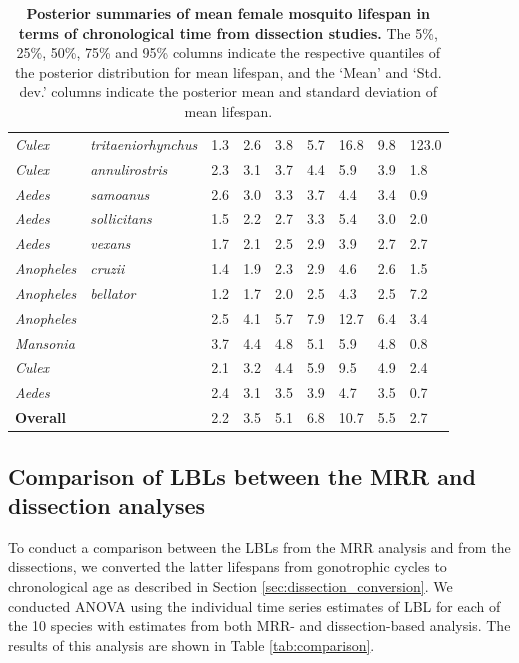 \documentclass[12pt]{article}
\begin{document}
\begin{table}[htbp!]
\begin{tabular}{l|l|l|l|l|l|l|l|l}
		\textit{Culex} & \textit{tritaeniorhynchus} & 1.3 & 2.6 & 3.8 & 5.7 & 16.8 & 9.8 & 123.0 \\
		\textit{Culex} & \textit{annulirostris} & 2.3 & 3.1 & 3.7 & 4.4 & 5.9 & 3.9 & 1.8 \\
		\textit{Aedes} & \textit{samoanus} & 2.6 & 3.0 & 3.3 & 3.7 & 4.4 & 3.4 & 0.9 \\
		\textit{Aedes} & \textit{sollicitans} & 1.5 & 2.2 & 2.7 & 3.3 & 5.4 & 3.0 & 2.0 \\
		\textit{Aedes} & \textit{vexans} & 1.7 & 2.1 & 2.5 & 2.9 & 3.9 & 2.7 & 2.7 \\
		\textit{Anopheles} & \textit{cruzii} & 1.4 & 1.9 & 2.3 & 2.9 & 4.6 & 2.6 & 1.5 \\
		\textit{Anopheles} & \textit{bellator} & 1.2 & 1.7 & 2.0 & 2.5 & 4.3 & 2.5 & 7.2 \\
		\hline
		\textit{Anopheles} & \textit{} & 2.5 & 4.1 & 5.7 & 7.9 & 12.7 & 6.4 & 3.4 \\
		\textit{Mansonia} & \textit{} & 3.7 & 4.4 & 4.8 & 5.1 & 5.9 & 4.8 & 0.8 \\
		\textit{Culex} & \textit{} & 2.1 & 3.2 & 4.4 & 5.9 & 9.5 & 4.9 & 2.4 \\
		\textit{Aedes} & \textit{} & 2.4 & 3.1 & 3.5 & 3.9 & 4.7 & 3.5 & 0.7 \\
		\hline
		\textbf{Overall} & \textit{} & 2.2 & 3.5 & 5.1 & 6.8 & 10.7 & 5.5 & 2.7 \\
	\end{tabular}
	\caption{\textbf{Posterior summaries of mean female mosquito lifespan in terms of chronological time from dissection studies.} The 5\%, 25\%, 50\%, 75\% and 95\% columns indicate the respective quantiles of the posterior distribution for mean lifespan, and the `Mean' and `Std. dev.' columns indicate the posterior mean and standard deviation of mean lifespan.}
	\label{tab:dissection_estimated_lifespans_chron}%
\end{table}

\subsection{Comparison of LBLs between the MRR and dissection analyses}
To conduct a comparison between the LBLs from the MRR analysis and from the dissections, we converted the latter lifespans from gonotrophic cycles to chronological age as described in Section \ref{sec:dissection_conversion}. We conducted ANOVA using the individual time series estimates of LBL for each of the 10 species with estimates from both MRR- and dissection-based analysis. The results of this analysis are shown in Table \ref{tab:comparison}.
\end{document}
